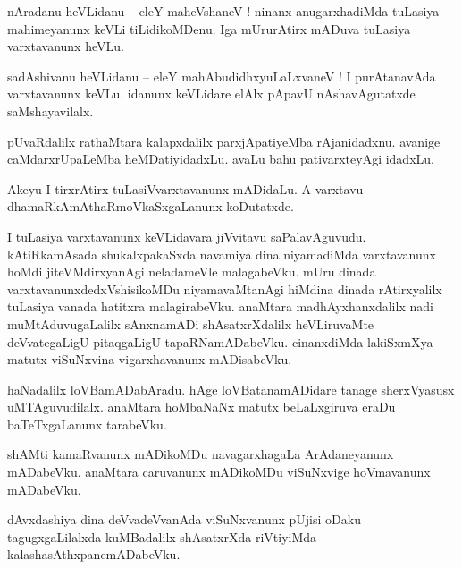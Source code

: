 \documentclass{article}
\begin{document}
\begin{mn}%
nAradanu heVLidanu -- eleY maheVshaneV ! ninanx anugarxhadiMda  tuLasiya mahimeyanunx keVLi tiLidikoMDenu. Iga 
mUrurAtirx mADuva tuLasiya varxtavanunx heVLu.
\end{mn}

\begin{mn}%
sadAshivanu heVLidanu -- eleY mahAbudidhxyuLaLxvaneV ! I purAtanavAda varxtavanunx keVLu. idanunx keVLidare elAlx pApavU
nAshavAgutatxde saMshayavilalx.
\end{mn}

\begin{mn}%
pUvaRdalilx rathaMtara kalapxdalilx parxjApatiyeMba rAjanidadxnu. avanige caMdarxrUpaLeMba heMDatiyidadxLu. avaLu bahu pativarxteyAgi idadxLu.
\end{mn}

\begin{mn}%
Akeyu I tirxrAtirx tuLasiVvarxtavanunx mADidaLu. A varxtavu dhamaRkAmAthaRmoVkaSxgaLanunx koDutatxde.
\end{mn}

\begin{mn}%
I tuLasiya varxtavanunx keVLidavara jiVvitavu saPalavAguvudu. kAtiRkamAsada shukalxpakaSxda navamiya dina niyamadiMda 
varxtavanunx hoMdi jiteVMdirxyanAgi neladameVle malagabeVku. mUru dinada varxtavanunxdedxVshisikoMDu niyamavaMtanAgi
hiMdina dinada rAtirxyalilx tuLasiya vanada hatitxra malagirabeVku. anaMtara madhAyxhanxdalilx nadi muMtAduvugaLalilx 
sAnxnamADi shAsatxrXdalilx heVLiruvaMte deVvategaLigU pitaqgaLigU tapaRNamADabeVku. cinanxdiMda lakiSxmXya matutx
viSuNxvina vigarxhavanunx mADisabeVku.
\end{mn}

\begin{mn}%
haNadalilx loVBamADabAradu. hAge loVBatanamADidare tanage sherxVyasusx uMTAguvudilalx. anaMtara hoMbaNaNx matutx beLaLxgiruva eraDu baTeTxgaLanunx tarabeVku.
\end{mn}

\begin{mn}%
shAMti kamaRvanunx mADikoMDu navagarxhagaLa ArAdaneyanunx mADabeVku. anaMtara caruvanunx mADikoMDu viSuNxvige hoVmavanunx mADabeVku.
\end{mn}

\begin{mn}%
dAvxdashiya dina deVvadeVvanAda viSuNxvanunx pUjisi oDaku tagugxgaLilalxda kuMBadalilx shAsatxrXda riVtiyiMda kalashasAthxpanemADabeVku.
\end{mn}
\end{document}
